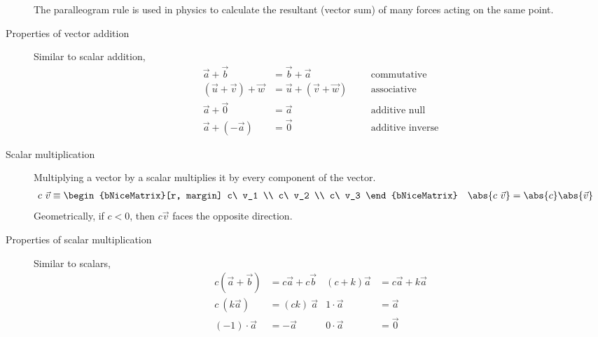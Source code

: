 \begin{description}
          The paralleogram rule is used in physics to calculate the resultant (vector sum)
          of many forces acting on the same point. \par

    \item[Properties of vector addition] Similar to scalar addition,
          \begin{align}
              \vec{a} + \vec{b}             & = \vec{b} + \vec{a}             &
                                            &                                 &
              \text{commutative}                                                \\
              (\vec{u} + \vec{v}) + \vec{w} & = \vec{u} + (\vec{v} + \vec{w}) &
                                            &                                 &
              \text{associative}                                                \\
              \vec{a} + \vec{0}             & = \vec{a}                       &
                                            &                                 &
              \text{additive null}                                              \\
              \vec{a} + (-\vec{a})          & = \vec{0}                       &
                                            &                                 &
              \text{additive inverse}
          \end{align}

    \item[Scalar multiplication] Multiplying a vector by a scalar multiplies it by
          every component of the vector.
          \begin{align}
              c\ \vec{v}         & \equiv \begin{bNiceMatrix}[r, margin]
                                              c\ v_1 \\ c\ v_2 \\ c\ v_3
                                          \end{bNiceMatrix} &
              \abs{ c\ \vec{v} } & = \abs{ c } \abs{ \vec{v} }
          \end{align}
          Geometrically, if $ c<0  $, then $ c \vec{v} $ faces the opposite direction.

    \item[Properties of scalar multiplication] Similar to scalars,
          \begin{align}
              c(\vec{a} + \vec{b}) & = c\vec{a} + c\vec{b} &
              (c + k)\vec{a}       & = c\vec{a} + k\vec{a}   \\
              c\ (k\vec{a})        & = (ck)\ \vec{a}       &
              1 \cdot \vec{a}      & = \vec{a}               \\
              (-1) \cdot \vec{a}   & = -\vec{a}            &
              0 \cdot \vec{a}      & = \vec{0}
          \end{align}


\end{description}
